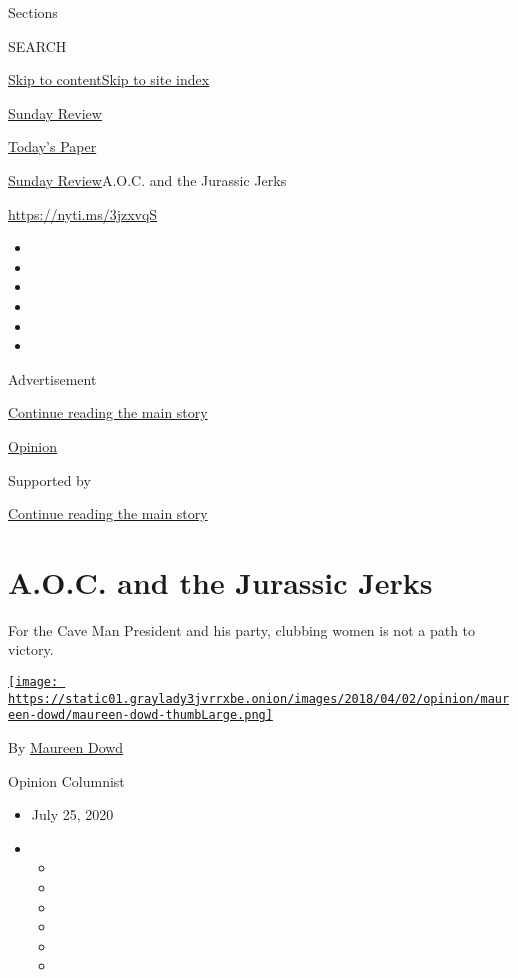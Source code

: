 Sections

SEARCH

\protect\hyperlink{site-content}{Skip to
content}\protect\hyperlink{site-index}{Skip to site index}

\href{https://www.nytimes3xbfgragh.onion/section/opinion/sunday}{Sunday
Review}

\href{https://myaccount.nytimes3xbfgragh.onion/auth/login?response_type=cookie\&client_id=vi}{}

\href{https://www.nytimes3xbfgragh.onion/section/todayspaper}{Today's
Paper}

\href{/section/opinion/sunday}{Sunday Review}\textbar{}A.O.C. and the
Jurassic Jerks

\url{https://nyti.ms/3jzxvqS}

\begin{itemize}
\item
\item
\item
\item
\item
\item
\end{itemize}

Advertisement

\protect\hyperlink{after-top}{Continue reading the main story}

\href{/section/opinion}{Opinion}

Supported by

\protect\hyperlink{after-sponsor}{Continue reading the main story}

\hypertarget{aoc-and-the-jurassic-jerks}{%
\section{A.O.C. and the Jurassic
Jerks}\label{aoc-and-the-jurassic-jerks}}

For the Cave Man President and his party, clubbing women is not a path
to victory.

\href{https://www.nytimes3xbfgragh.onion/by/maureen-dowd}{\texttt{[image: https://static01.graylady3jvrrxbe.onion/images/2018/04/02/opinion/maureen-dowd/maureen-dowd-thumbLarge.png]}}

By \href{https://www.nytimes3xbfgragh.onion/by/maureen-dowd}{Maureen
Dowd}

Opinion Columnist

\begin{itemize}
\item
  July 25, 2020
\item
  \begin{itemize}
  \item
  \item
  \item
  \item
  \item
  \item
  \end{itemize}
\end{itemize}

